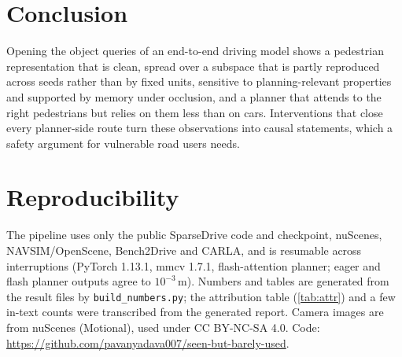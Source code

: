\documentclass[journal]{IEEEtran}
\begin{document}
\section{Conclusion}
Opening the object queries of an end-to-end driving model shows a pedestrian representation that is clean, spread over a
subspace that is partly reproduced across seeds rather than by fixed units, sensitive to planning-relevant properties and supported by memory under occlusion, and a planner
that attends to the right pedestrians but relies on them less than on cars. Interventions that close every planner-side
route turn these observations into causal statements, which a safety argument for vulnerable road users needs.

\section*{Reproducibility}
The pipeline uses only the public SparseDrive code and checkpoint, nuScenes, NAVSIM/OpenScene, Bench2Drive and CARLA, and
is resumable across interruptions (PyTorch 1.13.1, mmcv 1.7.1, flash-attention planner; eager and flash planner outputs
agree to $10^{-3}$\,m). Numbers and tables are generated from the result files by \texttt{build\_numbers.py}; the attribution table
(\cref{tab:attr}) and a few in-text counts were transcribed from the generated report.
Camera images are from nuScenes (Motional), used under CC BY-NC-SA 4.0. Code: \url{https://github.com/pavanyadava007/seen-but-barely-used}.



\end{document}
